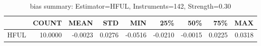 \begin{table}[ht]
\centering
\caption{bias summary: Estimator=HFUL, Instruments=142, Strength=0.30}
\begin{tabular}{lrrrrrrrr}
\toprule
 & COUNT & MEAN & STD & MIN & 25\% & 50\% & 75\% & MAX \\
\midrule
HFUL & 10.0000 & -0.0023 & 0.0276 & -0.0516 & -0.0210 & -0.0015 & 0.0225 & 0.0318 \\
\bottomrule
\end{tabular}
\end{table}
